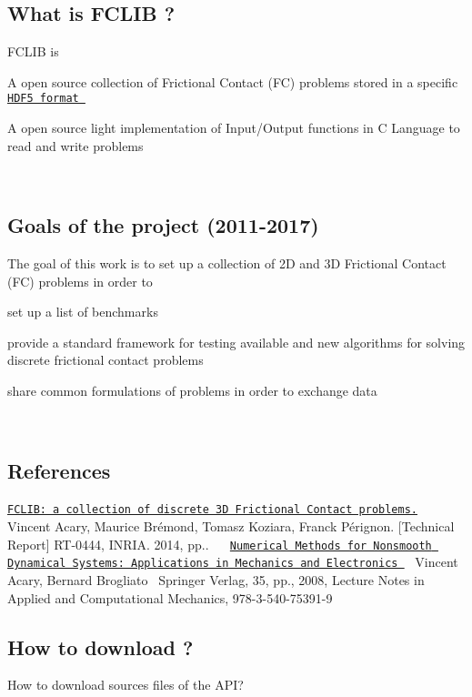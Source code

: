 \hypertarget{index_whatis}{}\subsection{What is F\+C\+L\+I\+B ?}\label{index_whatis}
F\+C\+L\+I\+B is 
\begin{DoxyItemize}
\item A open source collection of Frictional Contact (F\+C) problems stored in a specific \href{http://www.hdfgroup.org/HDF5/}{\tt H\+D\+F5 format } 
\item A open source light implementation of Input/\+Output functions in C Language to read and write problems  
\end{DoxyItemize}~\newline
\hypertarget{index_goals}{}\subsection{Goals of the project (2011-\/2017)}\label{index_goals}
The goal of this work is to set up a collection of 2\+D and 3\+D Frictional Contact (F\+C) problems in order to


\begin{DoxyItemize}
\item set up a list of benchmarks  
\item provide a standard framework for testing available and new algorithms for solving discrete frictional contact problems  
\item share common formulations of problems in order to exchange data 
\end{DoxyItemize}~\newline
\hypertarget{index_References}{}\subsection{References}\label{index_References}
\href{https://hal.inria.fr/hal-00945820v2/document}{\tt F\+C\+L\+I\+B\+: a collection of discrete 3\+D Frictional Contact problems.} ~\newline
 Vincent Acary, Maurice Br\'{e}mond, Tomasz Koziara, Franck P\'{e}rignon. \mbox{[}Technical Report\mbox{]} R\+T-\/0444, I\+N\+R\+I\+A. 2014, pp..~\newline
 ~\newline
 \href{https://hal.inria.fr/inria-00423530}{\tt Numerical Methods for Nonsmooth Dynamical Systems\+: Applications in Mechanics and Electronics }~\newline
 Vincent Acary, Bernard Brogliato~\newline
 Springer Verlag, 35, pp., 2008, Lecture Notes in Applied and Computational Mechanics, 978-\/3-\/540-\/75391-\/9 ~\newline
 ~\newline
 \hypertarget{index_howtodownload}{}\subsection{How to download  ?}\label{index_howtodownload}
How to download sources files of the A\+P\+I?


